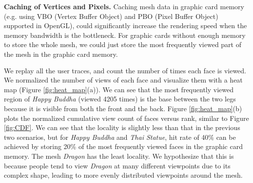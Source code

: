 \textbf{Caching of Vertices and Pixels.}
Caching mesh data in graphic card memory 
(e.g. using VBO (Vertex Buffer Object) and PBO (Pixel Buffer Object) supported in OpenGL), 
could significantly increase the rendering speed when the memory bandwidth is the bottleneck.
For graphic cards without enough memory to store the whole mesh, we could just store the most frequently viewed part of the mesh
in the graphic card memory. 

We replay all the user traces, and %
count the number of times each face is viewed.
We normalized the number of views of each face and visualize them with
 a heat map (Figure \ref{fig:heat_map}(a)). 
We can see that the most frequently viewed region of \textit{Happy Buddha} (viewed 4205 times) is 
the base between the two legs because it is visible from both the front and the back.
Figure \ref{fig:heat_map}(b) plots the normalized cumulative view count of faces versus rank, 
similar to Figure \ref{fig:CDF}. We can see that the locality is slightly less than
that in the previous two scenarios, but for \textit{Happy Buddha} and \textit{Thai Statue}, hit rate of 40\%  can be achieved
by storing 20\% of the most frequently viewed faces in the graphic card memory.
The mesh \textit{Dragon} has the least locality. We hypothesize that this is because %
people tend to view \textit{Dragon} at many different viewpoints due to its complex shape,
leading to more evenly distributed viewpoints around the mesh.
    
